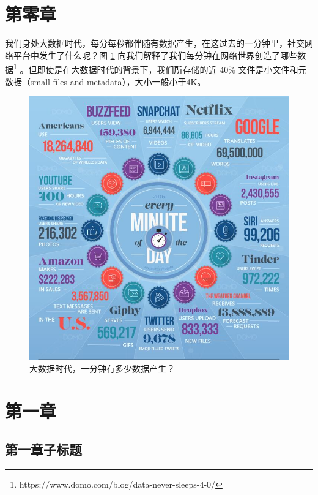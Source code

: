 \documentclass[a4paper]{article}
\begin{document}

\newpage
\clearpage
\tableofcontents 
\thispagestyle{empty}
\newpage

\setcounter{page}{1}


\section{第零章}

我们身处大数据时代，每分每秒都伴随有数据产生，在这过去的一分钟里，社交网络平台中发生了什么呢？图 \ref{fig:1} 向我们解释了我们每分钟在网络世界创造了哪些数据\footnote{https://www.domo.com/blog/data-never-sleeps-4-0/} 。但即使是在大数据时代的背景下，我们所存储的近 40\% 文件是小文件和元数据（small files and metadata），大小一般小于4K。

\begin{figure}[!htb]
\begin{center}
\includegraphics[width=.6\textwidth]{dada_generated_every_minute.jpg}
\caption{大数据时代，一分钟有多少数据产生？} \label{fig:1} 
\end{center}
\end{figure}


\section{第一章}

\subsection{第一章子标题}
\end{document}

